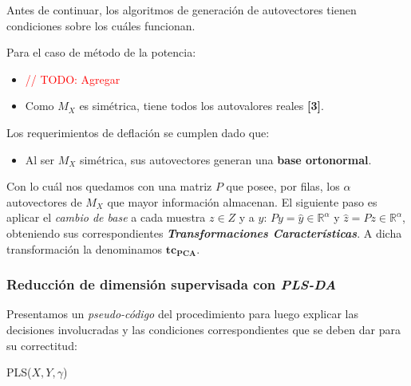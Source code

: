 Antes de continuar, los algoritmos de generaci\'on de autovectores tienen condiciones sobre los cu\'ales funcionan.

Para el caso de m\'etodo de la potencia:

\begin{itemize}
\item \textcolor{red}{// TODO: Agregar}
\item Como $M_{X}$ es sim\'etrica, tiene todos los autovalores reales \textbf{[3]}.
\end{itemize}

Los requerimientos de deflaci\'on se cumplen dado que:

\begin{itemize}
\item Al ser $M_{X}$ sim\'etrica, sus autovectores generan una \textbf{base ortonormal}.
\end{itemize}

Con lo cu\'al nos quedamos con una matriz $P$ que posee, por filas, los $\alpha$ autovectores de $M_{X}$ que mayor informaci\'on almacenan. El siguiente paso es aplicar el \textit{cambio de base} a cada muestra $z \in Z$ y a $y$: $Py = \hat{y} \in \mathbb{R}^{\alpha}$ y $\hat{z} = Pz \in \mathbb{R}^{\alpha}$, obteniendo sus correspondientes \textit{\textbf{Transformaciones Caracter\'isticas}}. A dicha transformaci\'on la denominamos $\mathbf{tc_{PCA}}$.

\subsubsection{Reducci\'on de dimensi\'on supervisada con \textit{PLS-DA}} \label{desarrollo_PLSDA}

Presentamos un \textit{pseudo-c\'odigo} del procedimiento para luego explicar las decisiones involucradas y las condiciones correspondientes que se deben dar para su correctitud: \\

\begin{algorithm}
\begin{algorithmic}[1]
 
\ENDFOR
{}
\end{algorithmic}
\caption{PLS($X, Y, \gamma$)}
\end{algorithm}

